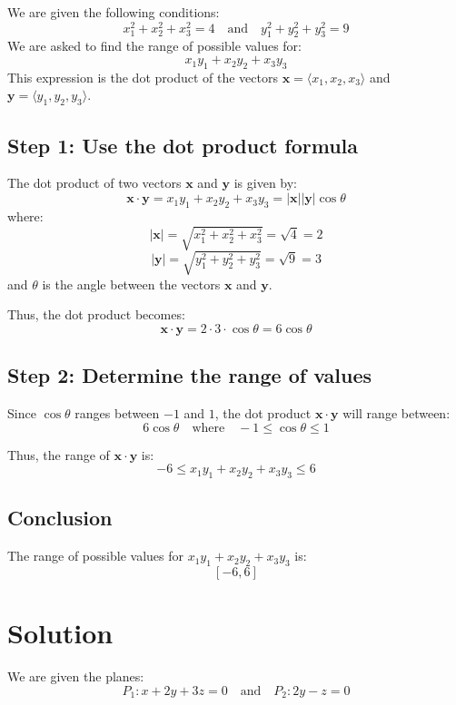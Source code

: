 \documentclass[11pt]{article}
\begin{document}
We are given the following conditions:
\[
x_1^2 + x_2^2 + x_3^2 = 4 \quad \text{and} \quad y_1^2 + y_2^2 + y_3^2 = 9
\]
We are asked to find the range of possible values for:
\[
x_1 y_1 + x_2 y_2 + x_3 y_3
\]
This expression is the dot product of the vectors \( \mathbf{x} = \langle x_1, x_2, x_3 \rangle \) and \( \mathbf{y} = \langle y_1, y_2, y_3 \rangle \).

\subsection*{Step 1: Use the dot product formula}

The dot product of two vectors \( \mathbf{x} \) and \( \mathbf{y} \) is given by:
\[
\mathbf{x} \cdot \mathbf{y} = x_1 y_1 + x_2 y_2 + x_3 y_3 = |\mathbf{x}| |\mathbf{y}| \cos \theta
\]
where:
\[
|\mathbf{x}| = \sqrt{x_1^2 + x_2^2 + x_3^2} = \sqrt{4} = 2
\]
\[
|\mathbf{y}| = \sqrt{y_1^2 + y_2^2 + y_3^2} = \sqrt{9} = 3
\]
and \( \theta \) is the angle between the vectors \( \mathbf{x} \) and \( \mathbf{y} \).

Thus, the dot product becomes:
\[
\mathbf{x} \cdot \mathbf{y} = 2 \cdot 3 \cdot \cos \theta = 6 \cos \theta
\]

\subsection*{Step 2: Determine the range of values}

Since \( \cos \theta \) ranges between \( -1 \) and \( 1 \), the dot product \( \mathbf{x} \cdot \mathbf{y} \) will range between:
\[
6 \cos \theta \quad \text{where} \quad -1 \leq \cos \theta \leq 1
\]

Thus, the range of \( \mathbf{x} \cdot \mathbf{y} \) is:
\[
-6 \leq x_1 y_1 + x_2 y_2 + x_3 y_3 \leq 6
\]

\subsection*{Conclusion}

The range of possible values for \( x_1 y_1 + x_2 y_2 + x_3 y_3 \) is:
\[
\boxed{[-6, 6]}
\]




\newpage

\section{Solution}

We are given the planes:
\[
P_1: x + 2y + 3z = 0 \quad \text{and} \quad P_2: 2y - z = 0
\]
\end{document}
